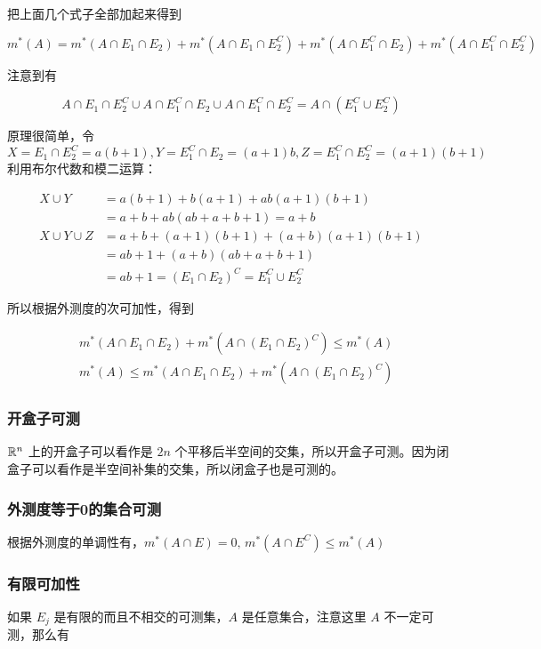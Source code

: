 把上面几个式子全部加起来得到

\[
m^*(A) = m^*(A \cap E_1 \cap E_2) + m^*(A \cap E_1 \cap E_2^{C}) + m^*(A \cap E_1^{C} \cap E_2) + m^*(A \cap E_1^{C} \cap E_2^C)
\]

注意到有 

\[
A \cap E_1 \cap E_2^{C} \cup A \cap E_1^{C} \cap E_2 \cup A \cap E_1^{C} \cap E_2^C = A \cap (E_1^C \cup E_2^C)
\]

原理很简单，令$X = E_1 \cap E_2^{C} = a(b+1), Y = E_1^{C} \cap E_2 = (a+1)b, Z = E_1^C \cap E_2^C = (a+1)(b+1)$ 利用布尔代数和模二运算：

\begin{align*}
    X \cup Y &= a(b+1) + b(a+1) + ab(a+1)(b+1) \\
        & = a + b + ab(ab + a+b + 1) = a+b \\
    X \cup Y \cup Z & = a + b + (a+1)(b+1) + (a+b)(a+1)(b+1) \\
    & = ab + 1 + (a+b)(ab + a+b + 1) \\
    &= ab + 1 = (E_1 \cap E_2)^C = E_1^C \cup E_2^C
\end{align*}

所以根据外测度的次可加性，得到

\begin{align*}
 & m^*(A \cap E_1 \cap E_2) + m^*(A \cap (E_1 \cap E_2)^C) \le m^*(A) \\
 & m^*(A) \le  m^*(A \cap E_1 \cap E_2) + m^*(A \cap (E_1 \cap E_2)^C)
\end{align*}

\subsubsection{开盒子可测}

$\mathbb{R}^n$ 上的开盒子可以看作是 $2n$ 个平移后半空间的交集，所以开盒子可测。因为闭盒子可以看作是半空间补集的交集，所以闭盒子也是可测的。

\subsubsection{外测度等于0的集合可测}

根据外测度的单调性有，$m^*(A \cap E) = 0,\, m^*(A \cap E^C) \le m^*(A)$

\subsubsection{有限可加性}

如果 $E_j$ 是有限的而且不相交的可测集，$A$ 是任意集合，注意这里 $A$ 不一定可测，那么有

